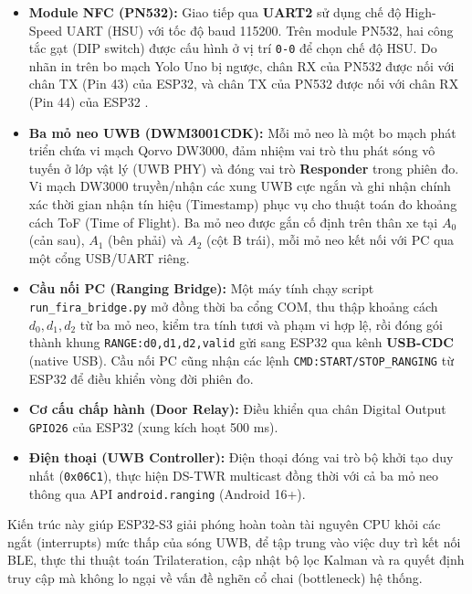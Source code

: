 \begin{itemize}
    \item \textbf{Module NFC (PN532):} Giao tiếp qua \textbf{UART2} sử dụng chế độ High-Speed UART (HSU) với tốc độ baud 115200. Trên module PN532, hai công tắc gạt (DIP switch) được cấu hình ở vị trí \texttt{0-0} để chọn chế độ HSU. Do nhãn in trên bo mạch Yolo Uno bị ngược, chân RX của PN532 được nối với chân TX (Pin 43) của ESP32, và chân TX của PN532 được nối với chân RX (Pin 44) của ESP32 \cite{nxp_pn532}.

    \item \textbf{Ba mỏ neo UWB (DWM3001CDK):} Mỗi mỏ neo là một bo mạch phát triển chứa vi mạch Qorvo DW3000, đảm nhiệm vai trò thu phát sóng vô tuyến ở lớp vật lý (UWB PHY) và đóng vai trò \textbf{Responder} trong phiên đo. Vi mạch DW3000 truyền/nhận các xung UWB cực ngắn và ghi nhận chính xác thời gian nhận tín hiệu (Timestamp) phục vụ cho thuật toán đo khoảng cách ToF (Time of Flight). Ba mỏ neo được gắn cố định trên thân xe tại $A_0$ (cản sau), $A_1$ (bên phải) và $A_2$ (cột B trái), mỗi mỏ neo kết nối với PC qua một cổng USB/UART riêng.

    \item \textbf{Cầu nối PC (Ranging Bridge):} Một máy tính chạy script \texttt{run\_fira\_bridge.py} mở đồng thời ba cổng COM, thu thập khoảng cách $d_0, d_1, d_2$ từ ba mỏ neo, kiểm tra tính tươi và phạm vi hợp lệ, rồi đóng gói thành khung \texttt{RANGE:d0,d1,d2,valid} gửi sang ESP32 qua kênh \textbf{USB-CDC} (native USB). Cầu nối PC cũng nhận các lệnh \texttt{CMD:START/STOP\_RANGING} từ ESP32 để điều khiển vòng đời phiên đo.

    \item \textbf{Cơ cấu chấp hành (Door Relay):} Điều khiển qua chân Digital Output \texttt{GPIO26} của ESP32 (xung kích hoạt 500 ms).

    \item \textbf{Điện thoại (UWB Controller):} Điện thoại đóng vai trò bộ khởi tạo duy nhất (\texttt{0x06C1}), thực hiện DS-TWR multicast đồng thời với cả ba mỏ neo thông qua API \texttt{android.ranging} (Android 16+).
\end{itemize}

Kiến trúc này giúp ESP32-S3 giải phóng hoàn toàn tài nguyên CPU khỏi các ngắt (interrupts) mức thấp của sóng UWB, để tập trung vào việc duy trì kết nối BLE, thực thi thuật toán Trilateration, cập nhật bộ lọc Kalman và ra quyết định truy cập mà không lo ngại về vấn đề nghẽn cổ chai (bottleneck) hệ thống.

